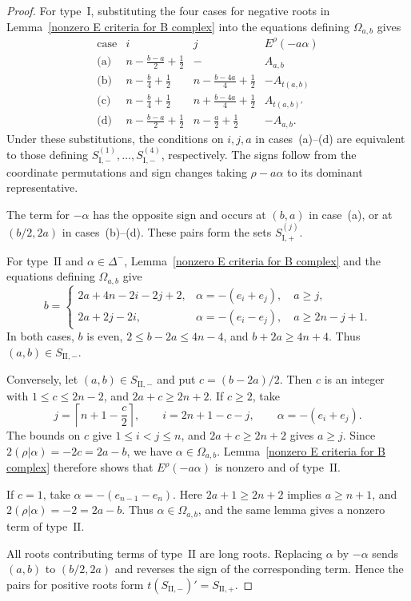 \documentclass[11pt,a4paper]{amsart}
\theoremstyle{plain}
\numberwithin{equation}{section}
\newenvironment{pf}{\begin{proof}}{\end{proof}}
\begin{document}
\begin{pf}
For type~\(\mathrm I\), substituting the four cases for negative
roots in Lemma~\ref{nonzero E criteria for B complex}
into the equations defining \(\Omega_{a,b}\) gives
\[
\begin{array}{c|c|c|c}
\text{case}&i&j&E^\rho(-a\alpha)\\ \hline
\text{(a)}&n-\frac{b-a}{2}+\frac12&-&A_{a,b}\\
\text{(b)}&n-\frac b4+\frac12&
n-\frac{b-4a}{4}+\frac12&-A_{t(a,b)}\\
\text{(c)}&n-\frac b4+\frac12&
n+\frac{b-4a}{4}+\frac12&A_{t(a,b)'}\\
\text{(d)}&n-\frac{b-a}{2}+\frac12&
n-\frac a2+\frac12&-A_{a,b}.
\end{array}
\]
Under these substitutions, the conditions on \(i,j,a\) in
cases~(a)--(d) are equivalent to those defining
\(S_{\mathrm{I},-}^{(1)},\ldots,S_{\mathrm{I},-}^{(4)}\),
respectively.
The signs follow from the coordinate permutations and sign
changes taking \(\rho-a\alpha\) to its dominant representative.

The term for \(-\alpha\) has the opposite sign and occurs at
\((b,a)\) in case~(a), or at \((b/2,2a)\) in cases~(b)--(d).
These pairs form the sets \(S_{\mathrm I,+}^{(j)}\).

For type~\(\mathrm{II}\) and \(\alpha\in\Delta^-\),
Lemma~\ref{nonzero E criteria for B complex} and the equations
defining \(\Omega_{a,b}\) give
\[
b=
\begin{cases}
2a+4n-2i-2j+2,
&\alpha=-(e_i+e_j),\quad a\ge j,\\
2a+2j-2i,
&\alpha=-(e_i-e_j),\quad a\ge2n-j+1.
\end{cases}
\]
In both cases, \(b\) is even,
\(2\le b-2a\le4n-4\), and \(b+2a\ge4n+4\).
Thus \((a,b)\in S_{\mathrm{II},-}\).

Conversely, let \((a,b)\in S_{\mathrm{II},-}\) and put
\(c=(b-2a)/2\).
Then \(c\) is an integer with \(1\le c\le2n-2\), and
\(2a+c\ge2n+2\).
If \(c\ge2\), take
\[
j=\left\lceil n+1-\frac c2\right\rceil,\qquad
i=2n+1-c-j,\qquad
\alpha=-(e_i+e_j).
\]
The bounds on \(c\) give \(1\le i<j\le n\), and
\(2a+c\ge2n+2\) gives \(a\ge j\).
Since \(2(\rho|\alpha)=-2c=2a-b\), we have
\(\alpha\in\Omega_{a,b}\).
Lemma~\ref{nonzero E criteria for B complex} therefore shows
that \(E^\rho(-a\alpha)\) is nonzero and of type~\(\mathrm{II}\).

If \(c=1\), take \(\alpha=-(e_{n-1}-e_n)\).
Here \(2a+1\ge2n+2\) implies \(a\ge n+1\), and
\(2(\rho|\alpha)=-2=2a-b\).
Thus \(\alpha\in\Omega_{a,b}\), and the same lemma gives a
nonzero term of type~\(\mathrm{II}\).

All roots contributing terms of type~\(\mathrm{II}\) are long roots.
Replacing \(\alpha\) by \(-\alpha\) sends \((a,b)\) to
\((b/2,2a)\) and reverses the sign of the corresponding term.
Hence the pairs for positive roots form
\(t(S_{\mathrm{II},-})'=S_{\mathrm{II},+}\).
\end{pf}
\end{document}
